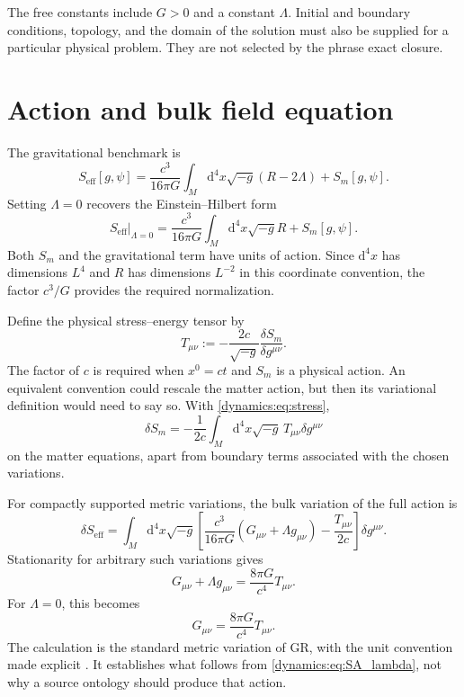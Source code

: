 \documentclass[11pt,oneside]{report}
\newcommand{\dd}{\mathrm d}
\theoremstyle{remark}
\numberwithin{definition}{chapter}
\numberwithin{proposition}{chapter}
\numberwithin{remark}{chapter}
\begin{document}
The free constants include $G>0$ and a constant $\Lambda$. Initial and boundary conditions, topology, and the domain of the solution must also be supplied for a particular physical problem. They are not selected by the phrase exact closure.

\section{Action and bulk field equation}
The gravitational benchmark is
\begin{equation}
S_{\mathrm{eff}}[g,\psi]=\frac{c^3}{16\pi G}
\int_M\dd^4x\sqrt{-g}(R-2\Lambda)+S_m[g,\psi].
\label{dynamics:eq:SA_lambda}
\end{equation}
Setting $\Lambda=0$ recovers the Einstein--Hilbert form
\begin{equation}
S_{\mathrm{eff}}\big|_{\Lambda=0}
=\frac{c^3}{16\pi G}\int_M\dd^4x\sqrt{-g}R+S_m[g,\psi].
\label{dynamics:eq:SA}
\end{equation}
Both $S_m$ and the gravitational term have units of action. Since $\dd^4x$ has dimensions $L^4$ and $R$ has dimensions $L^{-2}$ in this coordinate convention, the factor $c^3/G$ provides the required normalization.

Define the physical stress--energy tensor by
\begin{equation}
T_{\mu\nu}:=-\frac{2c}{\sqrt{-g}}
\frac{\delta S_m}{\delta g^{\mu\nu}}.
\label{dynamics:eq:stress}
\end{equation}
The factor of $c$ is required when $x^0=ct$ and $S_m$ is a physical action. An equivalent convention could rescale the matter action, but then its variational definition would need to say so. With \eqref{dynamics:eq:stress},
\begin{equation}
\delta S_m=-\frac{1}{2c}\int_M\dd^4x\sqrt{-g}\,
T_{\mu\nu}\delta g^{\mu\nu}
\end{equation}
on the matter equations, apart from boundary terms associated with the chosen variations.

For compactly supported metric variations, the bulk variation of the full action is
\begin{equation}
\delta S_{\mathrm{eff}}=
\int_M\dd^4x\sqrt{-g}\left[
\frac{c^3}{16\pi G}(G_{\mu\nu}+\Lambda g_{\mu\nu})-
\frac{T_{\mu\nu}}{2c}\right]\delta g^{\mu\nu}.
\end{equation}
Stationarity for arbitrary such variations gives
\begin{equation}
\boxed{G_{\mu\nu}+\Lambda g_{\mu\nu}=\frac{8\pi G}{c^4}T_{\mu\nu}.}
\label{dynamics:eq:einstein_lambda}
\end{equation}
For $\Lambda=0$, this becomes
\begin{equation}
G_{\mu\nu}=\frac{8\pi G}{c^4}T_{\mu\nu}.
\label{dynamics:eq:einstein}
\end{equation}
The calculation is the standard metric variation of GR, with the unit convention made explicit \parencite{Carroll1997}. It establishes what follows from \eqref{dynamics:eq:SA_lambda}, not why a source ontology should produce that action.
\end{document}
